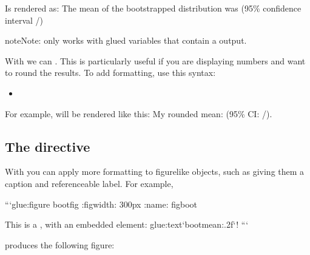 \documentclass[letterpaper,10pt,english]{jupyterBook}
\begin{document}
\sphinxAtStartPar
Is rendered as:
The mean of the bootstrapped distribution was  (95\% confidence interval /)

\begin{sphinxadmonition}{note}{Note:}
\sphinxAtStartPar
{} only works with glued variables that contain a  output.
\end{sphinxadmonition}

\sphinxAtStartPar
With  we can .
This is particularly useful if you are displaying numbers and
want to round the results. To add formatting, use this syntax:
\begin{itemize}
\item {} 
\sphinxAtStartPar
{}

\end{itemize}

\sphinxAtStartPar
For example,  will be rendered like this: My rounded mean:  (95\% CI: /).


\subsection{The  directive}
\label{\detokenize{overview:the-glue-figure-directive}}
\sphinxAtStartPar
With  you can apply more formatting to figure\sphinxhyphen{}like objects,
such as giving them a caption and referenceable label. For example,

\begin{sphinxVerbatim}[commandchars=\\\{\}]
```\PYGZob{}glue:figure\PYGZcb{} boot\PYGZus{}fig
:figwidth: 300px
:name: \PYGZdq{}fig\PYGZhy{}boot\PYGZdq{}

This is a , with an embedded  element: \PYGZob{}glue:text\PYGZcb{}`boot\PYGZus{}mean:.2f`!
```
\end{sphinxVerbatim}

\sphinxAtStartPar
produces the following figure:
\end{document}
